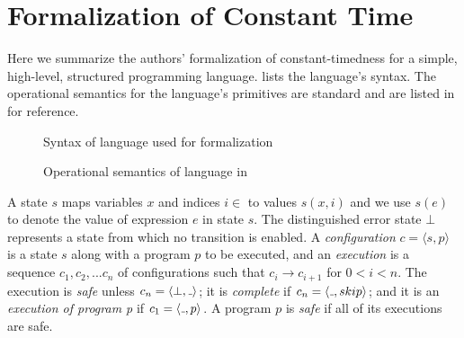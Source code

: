 \section{Formalization of Constant Time}
\label{sec:prelimnaries}


Here we summarize the authors' formalization of constant-timedness for a simple, high-level, structured programming language. 
 lists the language's syntax. 
The operational semantics for the language's primitives are standard and are listed in  for reference.

\begin{figure}[h!]
\centering
{}
 \caption{Syntax of language used for formalization}
 \label{fig:syntax}
\end{figure}

\begin{figure}[h!]
\centering
{}
 \caption{Operational semantics of language in }
 \label{fig:semantics}
\end{figure}

A state $s$ maps variables $x$ and indices $i \in $ to values $s(x,i)$ and we use $s(e)$ to denote the value of expression $e$ in state $s$. 
The distinguished error state $\bot$ represents a state from which no transition is enabled. A \emph{configuration} $c = \langle s,p \rangle$ is a state $s$ along with a program $p$ to be executed, and an \emph{execution} is a sequence $c_{1},c_{2},...c_{n}$ of configurations such that  $c_{i} \to c_{i+1}$ for $0<i<n$. The execution is \emph{safe} unless $c_{n} = \langle\bot,\mathunderscore\rangle$; it is \emph{complete} if $c_{n} = \langle\mathunderscore,skip\rangle$; and it is an \emph{execution of program p} if $c_{1} = \langle\mathunderscore,p\rangle$. A program $p$ is \emph{safe} if all of its executions are safe. 

